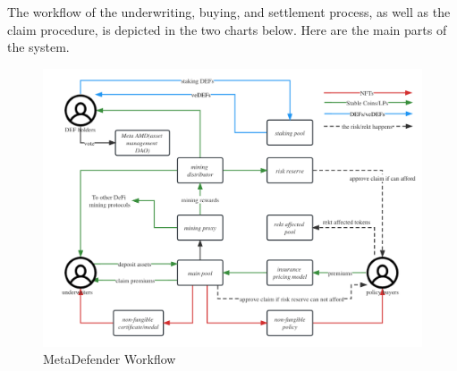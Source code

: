 The workflow of the underwriting, buying, and settlement process, as well as the claim procedure, is depicted in the two charts below.
Here are the main parts of the system.

\begin{figure}[H]
	\includegraphics[width=\linewidth]{./graphs/MD workflow} %
	\caption{MetaDefender Workflow} %
	\label{fig:workflow} %
\end{figure}

